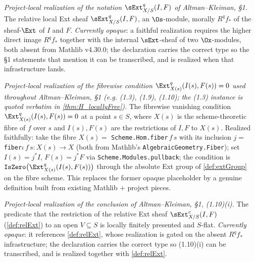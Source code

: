 \begin{definition}
  \label{def:relExt}
  \textit{Project-local realization of the notation $\sExt^q_{X/S}(I,F)$ of Altman--Kleiman, §1.}
  The relative local Ext sheaf $\sExt^q_{X/S}(I,F)$, an $\Os$-module, morally
  $R^q f_*$ of the sheaf-$\Ext$ of $I$ and $F$. \emph{Currently opaque}: a
  faithful realization requires the higher direct image $R^q f_*$ together with the
  internal $\sExt$-sheaf of two $\Ox$-modules, both absent from Mathlib v4.30.0; the
  declaration carries the correct type so the §1 statements that mention it can be
  transcribed, and is realized when that infrastructure lands.
\end{definition}

\begin{definition}[Fibrewise Ext-vanishing $\Ext^q_{X(s)}(I(s),F(s)) = 0$]\leanok
  \label{def:fiberExtVanishes}
  \textit{Project-local realization of the fibrewise condition $\Ext^q_{X(s)}(I(s),F(s))=0$ used throughout Altman--Kleiman, §1 (e.g. (1.3), (1.9), (1.10); the (1.3) instance is quoted verbatim in \cref{thm:H_locallyFree}).}
  The fibrewise vanishing condition $\Ext^q_{X(s)}(I(s),F(s)) = 0$ at a point
  $s \in S$, where $X(s)$ is the scheme-theoretic fibre of $f$ over $s$ and
  $I(s), F(s)$ are the restrictions of $I, F$ to $X(s)$. Realized faithfully: take
  the fibre $X(s) = $ \texttt{Scheme.Hom.fiber}\,$f\,s$ with its inclusion
  $j = $ \texttt{fiber\(\iota\)}\,$f\,s : X(s) \to X$ (both from Mathlib's
  \texttt{AlgebraicGeometry.Fiber}); set $I(s) = j^* I$, $F(s) = j^* F$ via
  \texttt{Scheme.Modules.pullback}; the condition is
  $\mathtt{IsZero}\big(\Ext^q_{X(s)}(I(s), F(s))\big)$ through the absolute Ext
  group of \cref{def:extGroup} on the fibre scheme. This replaces the former opaque
  placeholder by a genuine definition built from existing Mathlib + project pieces.
\end{definition}

\begin{definition}
  \label{def:isLFPAndFlatOn}
  \textit{Project-local realization of the conclusion of Altman--Kleiman, §1, (1.10)(i).}
  The predicate that the restriction of the relative Ext sheaf
  $\sExt^c_{X/S}(I,F)$ (\cref{def:relExt}) to an open $V \subseteq S$ is locally
  finitely presented and $S$-flat. \emph{Currently opaque}: it references
  \cref{def:relExt}, whose realization is gated on the absent $R^q f_*$
  infrastructure; the declaration carries the correct type so (1.10)(i) can be
  transcribed, and is realized together with \cref{def:relExt}.
\end{definition}

